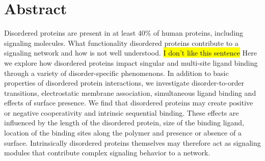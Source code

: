 \documentclass[../AdvancementSummary.tex]{subfiles}
\begin{document}
\section{Abstract}

Disordered proteins are present in at least 40\% of human proteins, including signaling molecules. What functionality disordered proteins contribute to a signaling network and how is not well understood. \hl{I don't like this sentence} Here we explore how disordered proteins impact singular and multi-site ligand binding through a variety of disorder-specific phenomenons. In addition to basic properties of disordered protein interactions, we investigate disorder-to-order transitions, electrostatic membrane association, simultaneous ligand binding and effects of surface presence. We find that disordered proteins may create positive or negative cooperativity and intrinsic sequential binding.  These effects are influenced by the length of the disordered protein, size of the binding ligand, location of the binding sites along the polymer and presence or absence of a surface. Intrinsically disordered proteins themselves may therefore act as signaling modules that contribute complex signaling behavior to a network.
\end{document}
